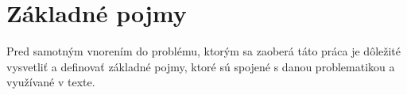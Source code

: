 \section{Základné pojmy}
Pred samotným vnorením do problému, ktorým sa zaoberá táto práca je dôležité vysvetliť a definovať základné pojmy, ktoré sú spojené s danou problematikou a využívané v texte.









